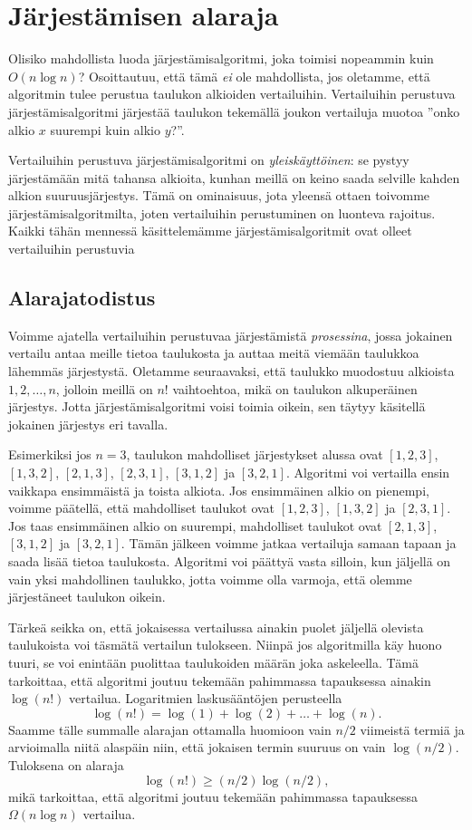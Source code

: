 \section{Järjestämisen alaraja}

Olisiko mahdollista luoda järjestämisalgoritmi, joka toimisi
nopeammin kuin $O(n \log n)$?
Osoittautuu, että tämä \emph{ei} ole mahdollista,
jos oletamme, että algoritmin tulee perustua taulukon
alkioiden vertailuihin.
Vertailuihin perustuva järjestämisalgoritmi järjestää taulukon
tekemällä joukon vertailuja muotoa
''onko alkio $x$ suurempi kuin alkio $y$?''.

Vertailuihin perustuva järjestämisalgoritmi on \emph{yleiskäyttöinen}:
se pystyy järjestämään mitä tahansa alkioita,
kunhan meillä on keino saada selville kahden alkion suuruusjärjestys.
Tämä on ominaisuus, jota yleensä ottaen toivomme
järjestämisalgoritmilta, joten vertailuihin perustuminen
on luonteva rajoitus.
Kaikki tähän mennessä käsittelemämme järjestämisalgoritmit
ovat olleet vertailuihin perustuvia

\subsection{Alarajatodistus}

Voimme ajatella vertailuihin perustuvaa järjestämistä
\emph{prosessina}, jossa jokainen vertailu antaa meille tietoa
taulukosta ja auttaa meitä viemään taulukkoa lähemmäs järjestystä.
Oletamme seuraavaksi, että taulukko muodostuu alkioista
$1,2,\dots,n$, jolloin meillä on $n!$ vaihtoehtoa, mikä
on taulukon alkuperäinen järjestys.
Jotta järjestämisalgoritmi voisi toimia oikein,
sen täytyy käsitellä jokainen järjestys eri tavalla.

Esimerkiksi jos $n=3$, taulukon mahdolliset järjestykset alussa ovat
$[1,2,3]$, $[1,3,2]$, $[2,1,3]$, $[2,3,1]$, $[3,1,2]$ ja $[3,2,1]$.
Algoritmi voi vertailla ensin vaikkapa ensimmäistä ja toista alkiota.
Jos ensimmäinen alkio on pienempi, voimme päätellä,
että mahdolliset taulukot ovat $[1,2,3]$, $[1,3,2]$ ja $[2,3,1]$.
Jos taas ensimmäinen alkio on suurempi,
mahdolliset taulukot ovat $[2,1,3]$, $[3,1,2]$ ja $[3,2,1]$.
Tämän jälkeen voimme jatkaa vertailuja samaan tapaan
ja saada lisää tietoa taulukosta.
Algoritmi voi päättyä vasta silloin, kun jäljellä on vain yksi
mahdollinen taulukko, jotta voimme olla varmoja, että olemme
järjestäneet taulukon oikein.

Tärkeä seikka on, että jokaisessa vertailussa ainakin puolet jäljellä
olevista taulukoista voi täsmätä vertailun tulokseen.
Niinpä jos algoritmilla käy huono tuuri, se voi enintään puolittaa
taulukoiden määrän joka askeleella.
Tämä tarkoittaa, että algoritmi joutuu tekemään pahimmassa
tapauksessa ainakin $\log(n!)$ vertailua.
Logaritmien laskusääntöjen perusteella
\[
\log(n!) = \log(1)+\log(2)+\dots+\log(n).
\]
Saamme tälle summalle alarajan ottamalla huomioon vain
$n/2$ viimeistä termiä ja arvioimalla niitä alaspäin niin, 
että jokaisen termin suuruus on vain $\log(n/2)$. Tuloksena on alaraja
\[
\log(n!) \ge (n/2) \log(n/2),
\]
mikä tarkoittaa, että algoritmi joutuu tekemään
pahimmassa tapauksessa $\Omega(n \log n)$ vertailua.

